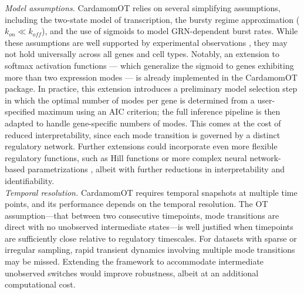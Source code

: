 \documentclass[a4paper, 11pt]{article}
\theoremstyle{plain}
\theoremstyle{remark}
\begin{document}
\textit{Model assumptions.} CardamomOT relies on several simplifying 
assumptions, including the two-state model of transcription, the bursty 
regime approximation ($k_{on} \ll k_{off}$), and the use of sigmoids to 
model GRN-dependent burst rates. While these assumptions are well supported 
by experimental observations \cite{da2025two, dar2012transcriptional}, they 
may not hold universally across all genes and cell types. Notably, an 
extension to softmax activation functions — which generalize the sigmoid to 
genes exhibiting more than two expression modes — is already implemented in 
the CardamomOT package. In practice, this extension introduces a preliminary 
model selection step in which the optimal number of modes per gene is 
determined from a user-specified maximum using an AIC criterion; the full 
inference pipeline is then adapted to handle gene-specific numbers of modes. 
This comes at the cost of reduced interpretability, since each mode 
transition is governed by a distinct regulatory network. Further extensions 
could incorporate even more flexible regulatory functions, such as Hill 
functions \cite{ismail2025exploring, herbachinferring2017} or more complex neural 
network-based parametrizations \cite{huang2026deep}, albeit with further 
reductions in interpretability and identifiability.\\

\textit{Temporal resolution.} CardamomOT requires temporal snapshots at multiple time points, and its performance depends on the temporal resolution. The OT assumption—that between two consecutive timepoints, mode transitions are direct with no unobserved intermediate states—is well justified when timepoints are sufficiently close relative to regulatory timescales. For datasets with sparse or irregular sampling, rapid transient dynamics involving multiple mode transitions may be missed. Extending the framework to accommodate intermediate unobserved switches would improve robustness, albeit at an additional computational cost.\\
\end{document}
